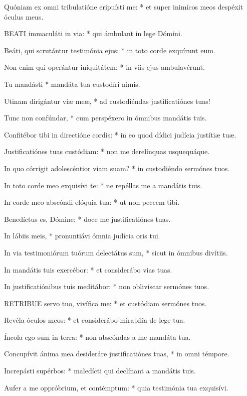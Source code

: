 Quóniam ex omni tribulatióne eripuísti me: * et super inimícos meos despéxit óculus meus.


\lettrine[lines=2]{B}{EATI} immaculáti in via: * qui ámbulant in lege Dómini.

Beáti, qui scrutántur testimónia ejus: * in toto corde exquírunt eum.

Non enim qui operántur iniquitátem: * in viis ejus ambulavérunt.

Tu mandásti * mandáta tua custodíri nimis.

Utinam dirigántur viæ meæ, * ad custodiéndas justificatiónes tuas!

Tunc non confúndar, * cum perspéxero in ómnibus mandátis tuis.

Confitébor tibi in directióne cordis: * in eo quod dídici judícia justítiæ tuæ.

Justificatiónes tuas custódiam: * non me derelínquas usquequáque.

In quo córrigit adolescéntior viam suam? * in custodiéndo sermónes tuos.

In toto corde meo exquisívi te: * ne repéllas me a mandátis tuis.

In corde meo abscóndi elóquia tua: * ut non peccem tibi.

Benedíctus es, Dómine: * doce me justificatiónes tuas.

In lábiis meis, * pronuntiávi ómnia judícia oris tui.

In via testimoniórum tuórum delectátus sum, * sicut in ómnibus divítiis.

In mandátis tuis exercébor: * et considerábo vias tuas.

In justificatiónibus tuis meditábor: * non oblivíscar sermónes tuos.


\lettrine[lines=2]{R}{ETRIBUE} servo tuo, vivífica me: * et custódiam sermónes tuos.

Revéla óculos meos: * et considerábo mirabília de lege tua.

Íncola ego sum in terra: * non abscóndas a me mandáta tua.

Concupívit ánima mea desideráre justificatiónes tuas, * in omni témpore.

Increpásti supérbos: * maledícti qui declínant a mandátis tuis.

Aufer a me oppróbrium, et contémptum: * quia testimónia tua exquisívi.


